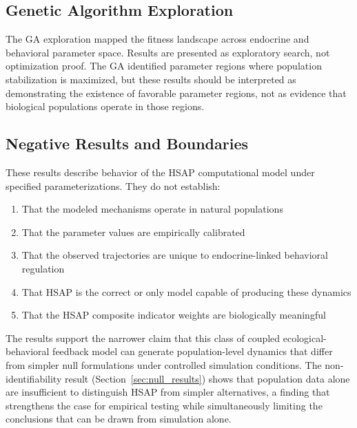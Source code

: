 \subsection{Genetic Algorithm Exploration}

The GA exploration mapped the fitness landscape across endocrine and behavioral parameter space. Results are presented as exploratory search, not optimization proof. The GA identified parameter regions where population stabilization is maximized, but these results should be interpreted as demonstrating the existence of favorable parameter regions, not as evidence that biological populations operate in those regions.

\subsection{Negative Results and Boundaries}
\label{sec:negative_results}

These results describe behavior of the HSAP computational model under specified parameterizations. They do not establish:

\begin{enumerate}
\item That the modeled mechanisms operate in natural populations
\item That the parameter values are empirically calibrated
\item That the observed trajectories are unique to endocrine-linked behavioral regulation
\item That HSAP is the correct or only model capable of producing these dynamics
\item That the HSAP composite indicator weights are biologically meaningful
\end{enumerate}

The results support the narrower claim that this class of coupled ecological-behavioral feedback model can generate population-level dynamics that differ from simpler null formulations under controlled simulation conditions. The non-identifiability result (Section~\ref{sec:null_results}) shows that population data alone are insufficient to distinguish HSAP from simpler alternatives, a finding that strengthens the case for empirical testing while simultaneously limiting the conclusions that can be drawn from simulation alone.
